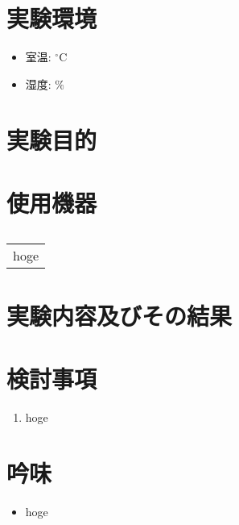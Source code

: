 \documentclass[uplatex, dvipdfmx, a4paper]{ujarticle}
\newcommand{\oC}[0]{\mathrm{^{\circ}C}}
\begin{document}
\section{実験環境}
\begin{itemize}
  \item 室温: $\oC$
  \item 湿度: $\%$
\end{itemize}

\section{実験目的}

\section{使用機器}
\begin{table}[H]
  \centering
  \caption{}
  \label{tab:machinary}
  \begin{tabular}{|c|} \hline
    hoge \\
  \end{tabular}
\end{table}

\section{実験内容及びその結果}

\begin{figure}[H]
  \centergin
  \caption{}
  \label{fig:}
\end{figure}

\section{検討事項}
\begin{enumerate}
  \item{hoge}
\end{enumerate}

\section{吟味}
\begin{itemize}
  \item{hoge}
\end{itemize}



\end{document}
